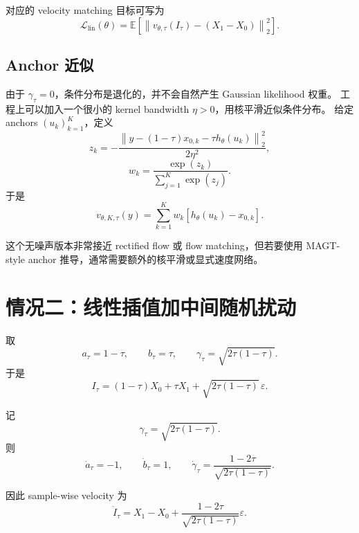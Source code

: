 \documentclass[UTF8,11pt]{ctexart}
\newcommand{\E}{\mathbb{E}}
\begin{document}
对应的 velocity matching 目标可写为
\begin{equation}
\mathcal{L}_{\mathrm{lin}}(\theta)
=
\E
\left[
\left\|
v_{\theta,\tau}(I_\tau)
-
(X_1-X_0)
\right\|_2^2
\right].
\end{equation}

\subsection{Anchor 近似}

由于 \(\gamma_\tau=0\)，条件分布是退化的，并不会自然产生 Gaussian likelihood 权重。
工程上可以加入一个很小的 kernel bandwidth \(\eta>0\)，用核平滑近似条件分布。
给定 anchors \((u_k)_{k=1}^K\)，定义
\begin{equation}
z_k
=
-
\frac{
\left\|
y-(1-\tau)x_{0,k}-\tau h_\theta(u_k)
\right\|_2^2
}{
2\eta^2
},
\end{equation}
\begin{equation}
w_k
=
\frac{\exp(z_k)}
{\sum_{j=1}^K\exp(z_j)}.
\end{equation}
于是
\begin{equation}
v_{\theta,K,\tau}(y)
=
\sum_{k=1}^{K}
w_k
\left[
h_\theta(u_k)-x_{0,k}
\right].
\end{equation}

这个无噪声版本非常接近 rectified flow 或 flow matching，但若要使用 MAGT-style anchor 推导，通常需要额外的核平滑或显式速度网络。

\section{情况二：线性插值加中间随机扰动}

取
\begin{equation}
a_\tau=1-\tau,
\qquad
b_\tau=\tau,
\qquad
\gamma_\tau=\sqrt{2\tau(1-\tau)}.
\end{equation}
于是
\begin{equation}
I_\tau
=
(1-\tau)X_0
+
\tau X_1
+
\sqrt{2\tau(1-\tau)}\,\varepsilon.
\end{equation}

记
\begin{equation}
\gamma_\tau=\sqrt{2\tau(1-\tau)}.
\end{equation}
则
\begin{equation}
\dot a_\tau=-1,
\qquad
\dot b_\tau=1,
\qquad
\dot\gamma_\tau
=
\frac{1-2\tau}
{\sqrt{2\tau(1-\tau)}}.
\end{equation}

因此 sample-wise velocity 为
\begin{equation}
\dot I_\tau
=
X_1-X_0
+
\frac{1-2\tau}
{\sqrt{2\tau(1-\tau)}}\varepsilon.
\end{equation}
\end{document}
